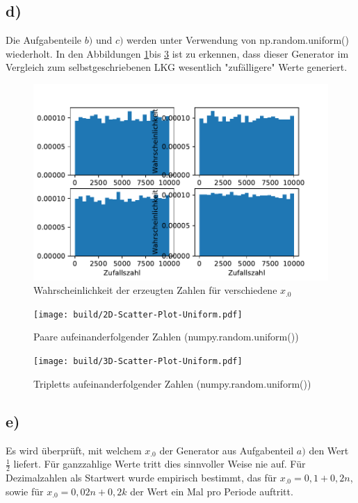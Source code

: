 \subsection*{d)}
Die Aufgabenteile $b)$ und $c)$ werden unter Verwendung von np.random.uniform() wiederholt. In den Abbildungen \ref{fig:Wahrkeit_rnd}bis \ref{fig:3D_rnd} ist zu erkennen, dass dieser Generator im Vergleich zum selbstgeschriebenen LKG wesentlich "zufälligere" Werte generiert.
\begin{figure}
  \includegraphics{Wahrschkeit_uniform.pdf}
  \caption{Wahrscheinlichkeit der erzeugten Zahlen für verschiedene $x_.0$}
  \label{fig:Wahrkeit_rnd}
\end{figure}
\begin{figure}
  \texttt{[image: build/2D-Scatter-Plot-Uniform.pdf]}
  \caption{Paare aufeinanderfolgender Zahlen (numpy.random.uniform())}
  \label{fig:2D_rnd}
\end{figure}
\begin{figure}
  \texttt{[image: build/3D-Scatter-Plot-Uniform.pdf]}
  \caption{Tripletts aufeinanderfolgender Zahlen (numpy.random.uniform())}
  \label{fig:3D_rnd}
\end{figure}
\subsection*{e)}
Es wird überprüft, mit welchem $x_.0$ der Generator aus Aufgabenteil $a)$
den Wert $\frac{1}{2}$ liefert. Für ganzzahlige Werte tritt dies sinnvoller Weise nie auf. Für Dezimalzahlen als Startwert wurde empirisch bestimmt, das für $x_.0 = 0,1 + 0,2n$, sowie für $x_.0 = 0,02n + 0,2k$ der Wert ein Mal pro Periode auftritt.
